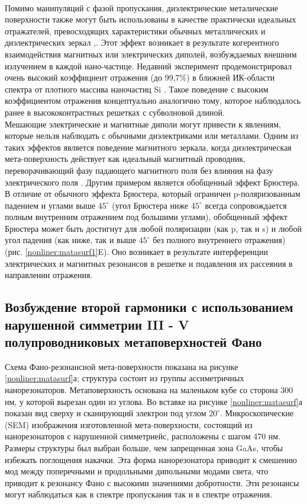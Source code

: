 \\
\hspace*{2mm}
Помимо манипуляций с фазой пропускания, диэлектрические металические поверхности также могут быть использованы в качестве практически идеальных отражателей, превосходящих характеристики обычных металлических и диэлектрических зеркал \cite{moitra2015large},\cite{nearRefcLayer}.  Этот эффект возникает в результате когерентного взаимодействия магнитных или электрических диполей, возбуждаемых внешним излучением в каждой нано-частице. Недавний эксперимент продемонстрировал очень высокий коэффициент отражения (до 99,7\%) в ближней ИК-области спектра от плотного массива наночастиц Si \cite{moitra2015large}. Такое поведение с высоким коэффициентом отражения концептуально аналогично тому, которое наблюдалось ранее в высококонтрастных решетках с субволновой длиной. 
\\
\hspace*{2mm}
Мешающие электрические и магнитные диполи могут привести к явлениям, которые нельзя наблюдать с обычными диэлектриками или металлами. Одним из таких эффектов является поведение магнитного зеркала, когда диэлектрическая мета-поверхность действует как идеальный магнитный проводник, переворачивающий фазу падающего магнитного поля без влияния на фазу электрического поля \cite{optMagnMirr}. Другим примером является обобщенный эффект Брюстера. В отличие от обычного эффекта Брюстера, который ограничен p-поляризованным падением и углами выше $45^\circ$ (угол Брюстера ниже $45^\circ$ всегда сопровождается полным внутренним отражением под большими углами), обобщенный эффект Брюстера может быть достигнут для любой поляризации (как p, так и s) и любой угол падения (как ниже, так и выше $45^\circ$ без полного внутреннего отражения) (рис. \ref{nonliner:matasurf1}E). Оно возникает в результате интерференции электрических и магнитных резонансов в решетке и подавления их рассеяния в направлении отражения.

\subsection*{Возбуждение второй гармоники с использованием нарушенной симметрии III - V полупроводниковых метаповерхностей Фано}

\hspace*{2mm}Схема Фано-резонансной мета-поверхности показана на рисунке  \ref{nonliner:matasurf}а; структура состоит из группы ассиметричных  нанорезонаторов. Метаповерхность основана на маленьком кубе со сторона 300 нм, у которой вырезан один из углова. Во вставке на рисунке  \ref{nonliner:matasurf}а показан вид сверху и сканирующий электрон под углом $20^\circ$. Микроскопические (SEM) изображения изготовленной мета-поверхности, состоящий из нанорезонаторов с нарушенной симметриейс, расположены с шагом 470 нм. Размеры структуры был выбран больше, чем запрещенная зона GaAs, чтобы избежать поглощения накачки. Эта форма нанорезонатора приводит к смешению мод между поперечными и продольными дипольными модами света, что приводит к резонансу Фано с высокими значениями добротности. Эти резонансы могут наблюдаться как в спектре  пропускания так и в спектре отражения.

